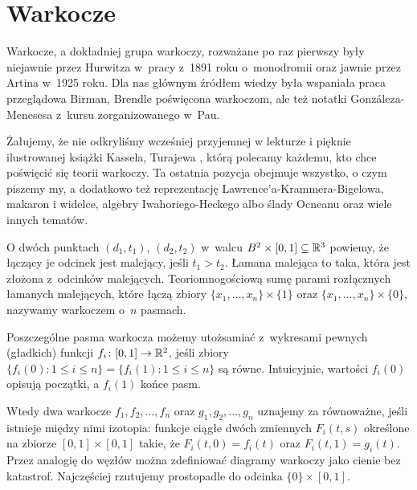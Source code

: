 
\section{Warkocze}
\label{sec:braid}%
%
Warkocze, a dokładniej grupa warkoczy, rozważane po raz pierwszy były niejawnie przez Hurwitza w~pracy z~1891 roku o~monodromii oraz jawnie przez Artina \cite{artin25} w~1925 roku.
%
Dla nas głównym źródłem wiedzy była wspaniała praca przeglądowa Birman, Brendle \cite{birman05} poświęcona warkoczom, ale też notatki Gonzáleza-Menesesa \cite{gonzalez11} z~kursu zorganizowanego w~Pau.
%
%
%

Żałujemy, że nie odkryliśmy wcześniej przyjemnej w lekturze i pięknie ilustrowanej książki Kassela, Turajewa \cite{kassel08}, którą polecamy każdemu, kto chce poświęcić się teorii warkoczy.
%
%
Ta ostatnia pozycja obejmuje wszystko, o czym piszemy my, a dodatkowo też reprezentację Lawrence'a-Krammera-Bigelowa, makaron i widelce, algebry Iwahoriego-Heckego albo ślady Ocneanu oraz wiele innych tematów.
%
%
%
%



\begin{definition}[warkocz]
%
O dwóch punktach $(d_1, t_1)$, $(d_2, t_2)$ w~walcu $B^2 \times [0, 1] \subseteq \mathbb R^3$ powiemy, że łączący je odcinek jest malejący, jeśli $t_1 > t_2$.
Łamana malejąca to taka, która jest złożona z~odcinków malejących.
Teoriomnogościową sumę parami rozłącznych łamanych malejących, które łączą zbiory $\{x_1, \ldots, x_n\} \times \{1\}$ oraz $\{x_1, \ldots, x_n\} \times \{0\}$, nazywamy warkoczem o~$n$ pasmach.
\end{definition}

Poszczególne pasma warkocza możemy utożsamiać z~wykresami pewnych (gładkich) funkcji $f_i \colon [0, 1] \to \mathbb R^2$, jeśli zbiory $\{f_i(0) : 1 \le i \le n\} = \{f_i(1) : 1 \le i \le n\}$ są równe.
Intuicyjnie, wartości $f_i(0)$ opisują początki, a $f_i(1)$ końce pasm.

Wtedy dwa warkocze $f_1, f_2, \ldots, f_n$ oraz $g_1, g_2, \ldots, g_n$ uznajemy za równoważne, jeśli istnieje między nimi izotopia: funkcje ciągłe dwóch zmiennych $F_i(t, s)$ określone na zbiorze $[0,1] \times [0,1]$ takie, że $F_i(t,0)= f_i(t)$ oraz $F_i(t, 1) = g_i(t)$.
Przez analogię do węzłów można zdefiniować diagramy warkoczy jako cienie bez katastrof.
Najczęściej rzutujemy prostopadle do odcinka $\{0\} \times [0, 1]$.

